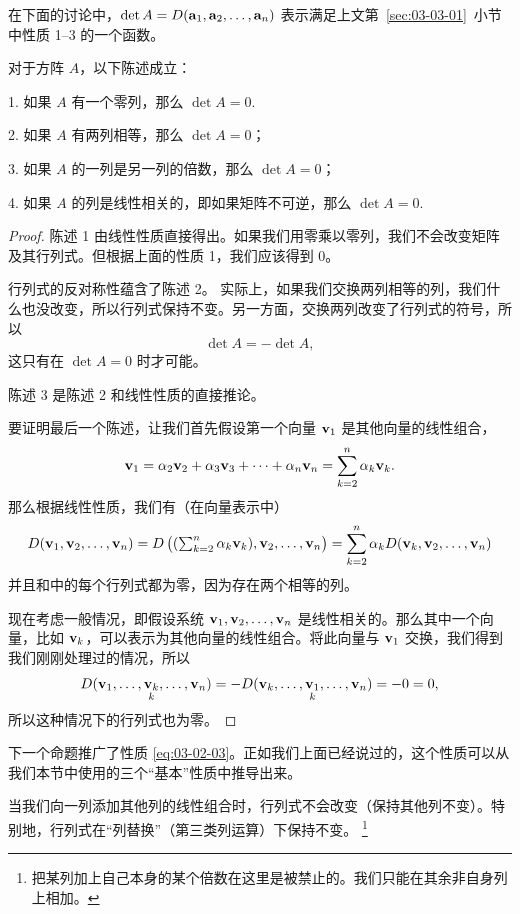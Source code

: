 在下面的讨论中，$\det A = D(\mathbf{a}_1, \mathbf{a}_2, \dots, \mathbf{a}_n)$ 表示满足上文第~\ref{sec:03-03-01}~小节中性质 1–3 的一个函数。

\begin{proposition}\label{stmt:03-03-01}
对于方阵 $A$，以下陈述成立：
\end{proposition}

1. 如果 $A$ 有一个零列，那么 $\det A = 0$.~

2. 如果 $A$ 有两列相等，那么 $\det A = 0$；

3. 如果 $A$ 的一列是另一列的倍数，那么 $\det A = 0$；

4. 如果 $A$ 的列是线性相关的，即如果矩阵不可逆，那么 $\det A = 0$.~

\begin{proof} 陈述 1 由线性性质直接得出。如果我们用零乘以零列，我们不会改变矩阵及其行列式。但根据上面的性质 1，我们应该得到 0。

行列式的反对称性蕴含了陈述 2。
实际上，如果我们交换两列相等的列，我们什么也没改变，所以行列式保持不变。另一方面，交换两列改变了行列式的符号，所以 $$\det A = -\det A,$$
这只有在 $\det A = 0$ 时才可能。

陈述 3 是陈述 2 和线性性质的直接推论。

要证明最后一个陈述，让我们首先假设第一个向量 $\mathbf{v}_1$ 是其他向量的线性组合，$$\mathbf{v}_1 = \alpha_2 \mathbf{v}_2 + \alpha_3 \mathbf{v}_3 + \dots + \alpha_n \mathbf{v}_n = \sum_{k=2}^n \alpha_k \mathbf{v}_k.$$
那么根据线性性质，我们有（在向量表示中）
$$
D(\mathbf{v}_1, \mathbf{v}_2, \dots, \mathbf{v}_n) =
D\begin{pmatrix}
(\sum_{k=2}^n \alpha_k \mathbf{v}_k), \mathbf{v}_2, \dots, \mathbf{v}_n \end{pmatrix}= \sum_{k=2}^n \alpha_k D(\mathbf{v}_k, \mathbf{v}_2, \dots, \mathbf{v}_n)
$$
并且和中的每个行列式都为零，因为存在两个相等的列。

现在考虑一般情况，即假设系统 $\mathbf{v}_1, \mathbf{v}_2, \dots, \mathbf{v}_n$ 是线性相关的。那么其中一个向量，比如 $\mathbf{v}_k$，可以表示为其他向量的线性组合。将此向量与 $\mathbf{v}_1$ 交换，我们得到我们刚刚处理过的情况，所以 $$D(\mathbf{v}_1, \dots, \underset{k}{\mathbf{v}_k}, \dots, \mathbf{v}_n) = -D(\mathbf{v}_k, \dots, \underset{k}{\mathbf{v}_1}, \dots, \mathbf{v}_n) = -0 = 0,$$
所以这种情况下的行列式也为零。\end{proof}

下一个命题推广了性质 \eqref{eq:03-02-03}。正如我们上面已经说过的，这个性质可以从我们本节中使用的三个“基本”性质中推导出来。

\begin{proposition}\label{stmt:03-03-02}
当我们向一列添加其他列的线性组合时，行列式不会改变（保持其他列不变）。特别地，行列式在“列替换”（第三类列运算）下保持不变。
\footnote{
把某列加上自己本身的某个倍数在这里是被禁止的。我们只能在其余非自身列上相加。
}
\end{proposition}

